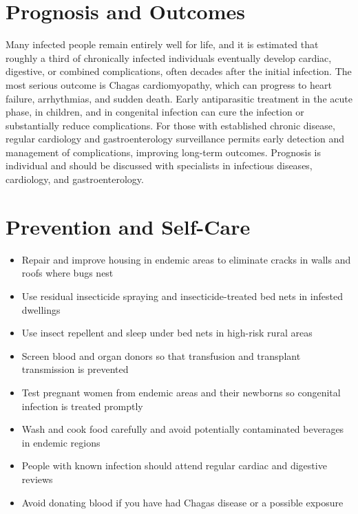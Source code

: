 \section*{Prognosis and Outcomes}
Many infected people remain entirely well for life, and it is estimated that roughly a third of chronically infected individuals eventually develop cardiac, digestive, or combined complications, often decades after the initial infection. The most serious outcome is Chagas cardiomyopathy, which can progress to heart failure, arrhythmias, and sudden death. Early antiparasitic treatment in the acute phase, in children, and in congenital infection can cure the infection or substantially reduce complications. For those with established chronic disease, regular cardiology and gastroenterology surveillance permits early detection and management of complications, improving long-term outcomes. Prognosis is individual and should be discussed with specialists in infectious diseases, cardiology, and gastroenterology.

\section*{Prevention and Self-Care}
\begin{itemize}
    \item Repair and improve housing in endemic areas to eliminate cracks in walls and roofs where bugs nest
    \item Use residual insecticide spraying and insecticide-treated bed nets in infested dwellings
    \item Use insect repellent and sleep under bed nets in high-risk rural areas
    \item Screen blood and organ donors so that transfusion and transplant transmission is prevented
    \item Test pregnant women from endemic areas and their newborns so congenital infection is treated promptly
    \item Wash and cook food carefully and avoid potentially contaminated beverages in endemic regions
    \item People with known infection should attend regular cardiac and digestive reviews
    \item Avoid donating blood if you have had Chagas disease or a possible exposure
\end{itemize}

